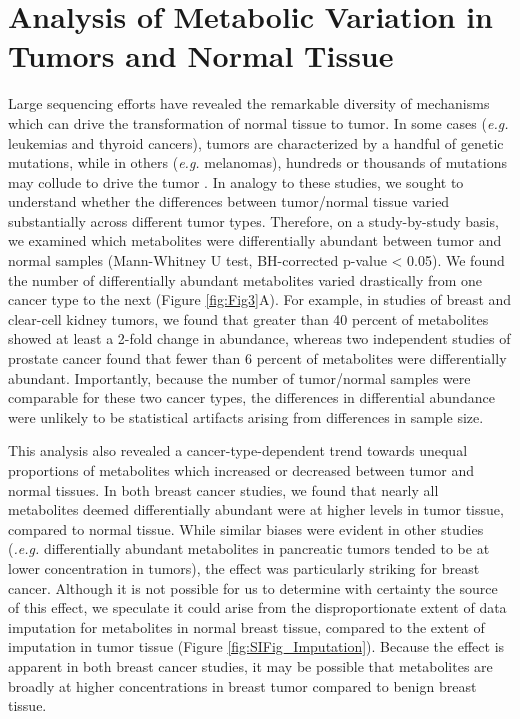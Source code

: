 \documentclass[10pt]{article}
\begin{document}
\section{Analysis of Metabolic Variation in Tumors and Normal Tissue}
Large sequencing efforts have revealed the remarkable diversity of mechanisms which can drive the transformation of normal tissue to tumor. In some cases (\textit{e.g.} leukemias and thyroid cancers), tumors are characterized by a handful of genetic mutations, while in others (\textit{e.g.} melanomas), hundreds or thousands of mutations may collude to drive the tumor \cite{Martincorena2015}. In analogy to these studies, we sought to understand whether the differences between tumor/normal tissue varied substantially across different tumor types. Therefore, on a study-by-study basis, we examined which metabolites were differentially abundant between tumor and normal samples (Mann-Whitney U test, BH-corrected p-value < 0.05). We found the number of differentially abundant metabolites varied drastically from one cancer type to the next (Figure \ref{fig:Fig3}A). For example, in studies of breast and clear-cell kidney tumors, we found that greater than 40 percent of metabolites showed at least a 2-fold change in abundance, whereas two independent studies of prostate cancer found that fewer than 6 percent of metabolites were differentially abundant. Importantly, because the number of tumor/normal samples were comparable for these two cancer types, the differences in differential abundance were unlikely to be statistical artifacts arising from differences in sample size.

This analysis also revealed a cancer-type-dependent trend towards unequal proportions of metabolites which increased or decreased between tumor and normal tissues. In both breast cancer studies, we found that nearly all metabolites deemed differentially abundant were at higher levels in tumor tissue, compared to normal tissue. While similar biases were evident in other studies (\textit{.e.g.} differentially abundant metabolites in pancreatic tumors tended to be at lower concentration in tumors), the effect was particularly striking for breast cancer. Although it is not possible for us to determine with certainty the source of this effect, we speculate it could arise from the disproportionate extent of data imputation for metabolites in normal breast tissue, compared to the extent of imputation in tumor tissue (Figure \ref{fig:SIFig_Imputation}). Because the effect is apparent in both breast cancer studies, it may be possible that metabolites are broadly at higher concentrations in breast tumor compared to benign breast tissue.
\end{document}
